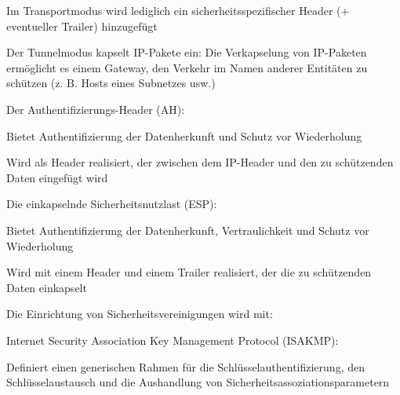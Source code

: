 \documentclass[a4paper]{article}
\begin{document}
\begin{multicols}{3}
      Im Transportmodus wird lediglich ein sicherheitsspezifischer Header (+ eventueller Trailer) hinzugefügt
      \begin{itemize*} %
            \item Der Tunnelmodus kapselt IP-Pakete ein: Die Verkapselung von IP-Paketen ermöglicht es einem Gateway, den Verkehr im Namen anderer Entitäten zu schützen (z. B. Hosts eines Subnetzes usw.)
            \item Der Authentifizierungs-Header (AH):
            \begin{itemize*}
                  \item Bietet Authentifizierung der Datenherkunft und Schutz vor Wiederholung
                  \item Wird als Header realisiert, der zwischen dem IP-Header und den zu schützenden Daten eingefügt wird
            \end{itemize*}
            \item Die einkapselnde Sicherheitsnutzlast (ESP):
            \begin{itemize*}
                  \item Bietet Authentifizierung der Datenherkunft, Vertraulichkeit und Schutz vor Wiederholung
                  \item Wird mit einem Header und einem Trailer realisiert, der die zu schützenden Daten einkapselt
            \end{itemize*}
            \item Die Einrichtung von Sicherheitsvereinigungen wird mit:
            \begin{itemize*}
                  \item Internet Security Association Key Management Protocol (ISAKMP):
                  \begin{itemize*}
                        \item Definiert einen generischen Rahmen für die Schlüsselauthentifizierung, den Schlüsselaustausch und die Aushandlung von Sicherheitsassoziationsparametern

\end{itemize*}
\end{itemize*}
\end{itemize*}
\end{multicols}
\end{document}
